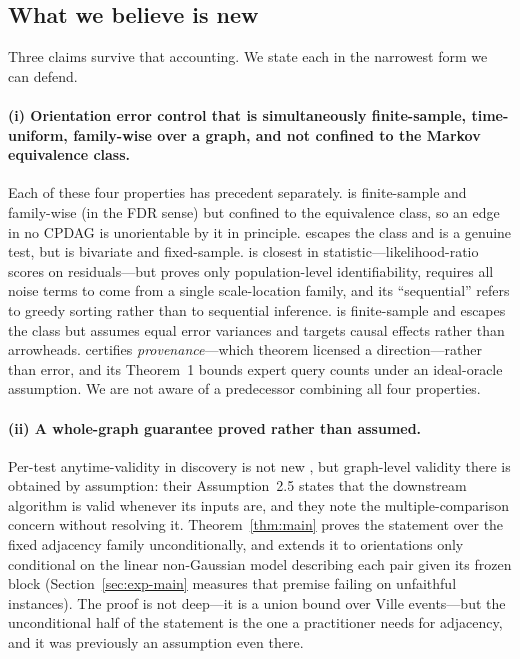 \documentclass[pdflatex,sn-apa]{sn-jnl}
\theoremstyle{thmstyleone}%
\theoremstyle{thmstyletwo}%
\theoremstyle{thmstylethree}%
\begin{document}
\subsection{What we believe is new}\label{sec:new}

Three claims survive that accounting. We state each in the narrowest form we
can defend.

\paragraph{(i) Orientation error control that is simultaneously
finite-sample, time-uniform, family-wise over a graph, and not confined to the
Markov equivalence class.} Each of these four properties has precedent
separately. \citet{strobl2019estimating} is finite-sample and family-wise (in
the FDR sense) but confined to the equivalence class, so an edge in no
CPDAG is unorientable by it in principle. \citet{shimizu2008use} escapes
the class and is a genuine test, but is bivariate and fixed-sample.
\citet{ruiz2022sequentially} is closest in statistic---likelihood-ratio scores
on residuals---but proves only population-level identifiability, requires all
noise terms to come from a single scale-location family, and its
``sequential'' refers to greedy sorting rather than to sequential inference.
\citet{strieder2023confidence} is finite-sample and escapes the class but
assumes equal error variances and targets causal effects rather than
arrowheads. \citet{uehara2026iterative} certifies \emph{provenance}---which
theorem licensed a direction---rather than error, and its Theorem~1 bounds
expert query counts under an ideal-oracle assumption. We are not aware of a
predecessor combining all four properties.

\paragraph{(ii) A whole-graph guarantee proved rather than assumed.}
Per-test anytime-validity in discovery is not new
\citep{csillag2025prediction}, but graph-level validity there is obtained by
assumption: their Assumption~2.5 states that the downstream algorithm is valid
whenever its inputs are, and they note the multiple-comparison concern without
resolving it. Theorem~\ref{thm:main} proves the statement over the fixed
adjacency family unconditionally, and extends it to orientations only
conditional on the linear non-Gaussian model describing each pair given its
frozen block (Section~\ref{sec:exp-main} measures that premise failing on
unfaithful instances). The proof is not deep---it is a union bound over Ville
events---but the unconditional half of the statement is the one a
practitioner needs for adjacency, and it was previously an assumption even
there.
\end{document}

